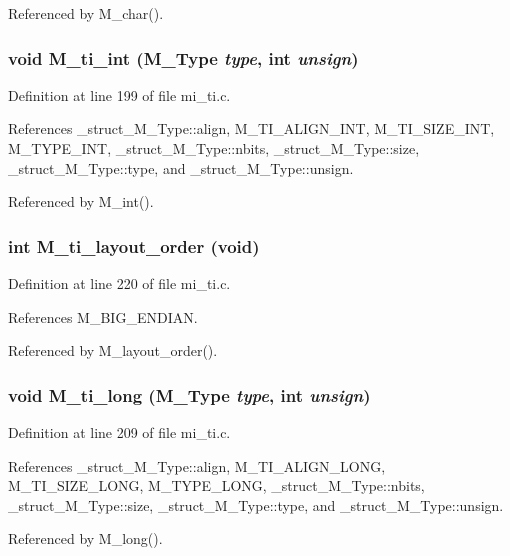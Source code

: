 Referenced by M\_\-char().
\subsubsection{\setlength{\rightskip}{0pt plus 5cm}void M\_\-ti\_\-int (\bf{M\_\-Type} {\em type}, int {\em unsign})}\label{mi__ti_8c_ccbca4c487f5a8c7616225f25e045dc3}




Definition at line 199 of file mi\_\-ti.c.

References \_\-struct\_\-M\_\-Type::align, M\_\-TI\_\-ALIGN\_\-INT, M\_\-TI\_\-SIZE\_\-INT, M\_\-TYPE\_\-INT, \_\-struct\_\-M\_\-Type::nbits, \_\-struct\_\-M\_\-Type::size, \_\-struct\_\-M\_\-Type::type, and \_\-struct\_\-M\_\-Type::unsign.

Referenced by M\_\-int().
\subsubsection{\setlength{\rightskip}{0pt plus 5cm}int M\_\-ti\_\-layout\_\-order (void)}\label{mi__ti_8c_a57839734123745b85f3ba32ff1ddf45}




Definition at line 220 of file mi\_\-ti.c.

References M\_\-BIG\_\-ENDIAN.

Referenced by M\_\-layout\_\-order().
\subsubsection{\setlength{\rightskip}{0pt plus 5cm}void M\_\-ti\_\-long (\bf{M\_\-Type} {\em type}, int {\em unsign})}\label{mi__ti_8c_d774fbbacbac4d176ffb594448574cc8}




Definition at line 209 of file mi\_\-ti.c.

References \_\-struct\_\-M\_\-Type::align, M\_\-TI\_\-ALIGN\_\-LONG, M\_\-TI\_\-SIZE\_\-LONG, M\_\-TYPE\_\-LONG, \_\-struct\_\-M\_\-Type::nbits, \_\-struct\_\-M\_\-Type::size, \_\-struct\_\-M\_\-Type::type, and \_\-struct\_\-M\_\-Type::unsign.

Referenced by M\_\-long().
